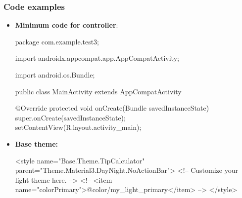 \documentclass{report}
\begin{document}
    \subsubsection{Code examples}
    \begin{itemize}
        \item \textbf{Minimum code for controller}:
            \bigbreak \noindent 
            \begin{javacode}
                package com.example.test3;

                import androidx.appcompat.app.AppCompatActivity;

                import android.os.Bundle;

                public class MainActivity extends AppCompatActivity {

                    @Override
                    protected void onCreate(Bundle savedInstanceState) {
                        super.onCreate(savedInstanceState);
                        setContentView(R.layout.activity_main);
                    }
                }
            \end{javacode}
        \item \textbf{Base theme:} 
            \bigbreak \noindent 
            \begin{xmlcode}
                <style name="Base.Theme.TipCalculator" parent="Theme.Material3.DayNight.NoActionBar">
                    <!-- Customize your light theme here. -->
                    <!-- <item name="colorPrimary">@color/my_light_primary</item> -->
                </style>
            \end{xmlcode}
    \end{itemize}
\end{document}
